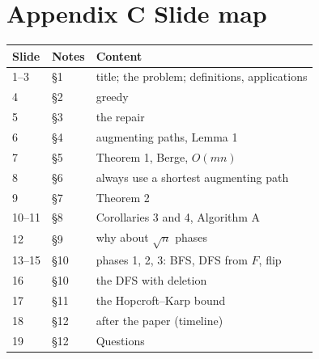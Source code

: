\documentclass[11pt,a4paper]{article}
\begin{document}
\section*{Appendix C \quad Slide map}
\begin{center}
\begin{tabular}{llp{9.5cm}}
\toprule
\textbf{Slide} & \textbf{Notes} & \textbf{Content}\\
\midrule
1--3 & \S1 & title; the problem; definitions, applications\\
4 & \S2 & greedy\\
5 & \S3 & the repair\\
6 & \S4 & augmenting paths, Lemma 1\\
7 & \S5 & Theorem 1, Berge, $O(mn)$\\
8 & \S6 & always use a shortest augmenting path\\
9 & \S7 & Theorem 2\\
10--11 & \S8 & Corollaries 3 and 4, Algorithm A\\
12 & \S9 & why about $\sqrt n$ phases\\
13--15 & \S10 & phases 1, 2, 3: BFS, DFS from $F$, flip\\
16 & \S10 & the DFS with deletion\\
17 & \S11 & the Hopcroft--Karp bound\\
18 & \S12 & after the paper (timeline)\\
19 & \S12 & Questions\\
\bottomrule
\end{tabular}
\end{center}
\end{document}
